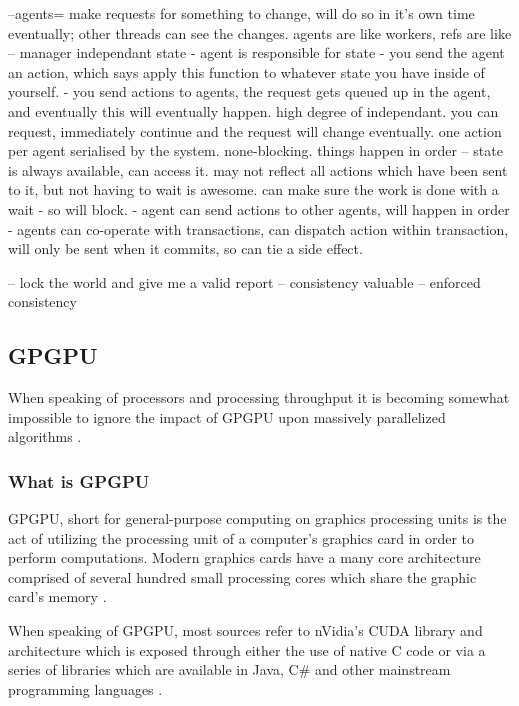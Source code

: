 \documentclass[12pt,a4paper]{article}
\begin{document}
--agents= make requests for something to change, will do so in it's own time eventually; other threads can see the changes. agents are like workers, refs are like
-- manager independant state - agent is responsible for state - you send the agent an action, which says apply this function to whatever state you have inside of yourself.
- you send actions to agents, the request gets queued up in the agent, and eventually this will eventually happen. high degree of independant. you can request, immediately continue and the request will change eventually. one action per agent serialised by the system. none-blocking. things happen in order -- state is always available, can access it. may not reflect all actions which have been sent to it, but not having to wait is awesome. can make sure the work is done with a wait - so will block. - agent can send actions to other agents, will happen in order - agents can co-operate with transactions, can dispatch action within transaction, will only be sent when it commits, so can tie a side effect.

-- lock the world and give me a valid report -- consistency valuable  -- enforced consistency

\cite{promisesOfFunctionalProgramming}
\cite{theFreeLunchIsOver}
\cite{concurrencyChallenges}

\newpage
\subsection{GPGPU}

When speaking of processors and processing throughput it is becoming somewhat impossible to ignore the impact of GPGPU upon massively parallelized algorithms \cite{gpuTutorial}.

\subsubsection{What is GPGPU}

GPGPU, short for general-purpose computing on graphics processing units is the act of utilizing the processing unit of a computer's graphics card in order to perform computations. Modern graphics cards have a many core architecture comprised of several hundred small processing cores which share the graphic card's memory \cite{gpuTutorial}. 

When speaking of GPGPU, most sources refer to nVidia's CUDA library and architecture which is exposed through either the use of native C code or via a series of libraries which are available in Java, C\# and other mainstream programming languages \cite{gpuTutorial}.
\end{document}
